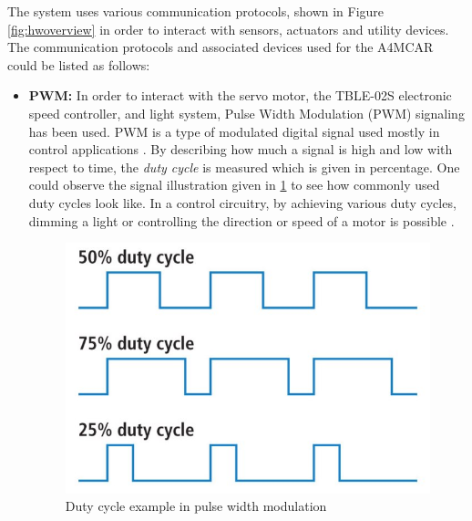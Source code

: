The system uses various communication protocols, shown in Figure \ref{fig:hwoverview} in order to interact with sensors, actuators and utility devices. The communication protocols and associated devices used for the A4MCAR could be listed as follows:
\begin{itemize}
	\item \textbf{PWM:} In order to interact with the servo motor, the TBLE-02S electronic speed controller, and light system, Pulse Width Modulation (PWM) signaling has been used. PWM is a type of modulated digital signal used mostly in control applications \cite{pwm}. By describing how much a signal is high and low with respect to time, the \textit{duty cycle} is measured which is given in percentage. One could observe the signal illustration given in \ref{fig:pwm} to see how commonly used duty cycles look like. In a control circuitry, by achieving various duty cycles, dimming a light or controlling the direction or speed of a motor is possible \cite{pwm}.
	\begin{figure}[!ht]
		\centering
		\captionsetup{justification=centering}
		\includegraphics[scale=0.5]{content/images/pwm.jpg}
		\caption{Duty cycle example in pulse width modulation \cite{pwm}}
		\label{fig:pwm}
	\end{figure}

\end{itemize}
